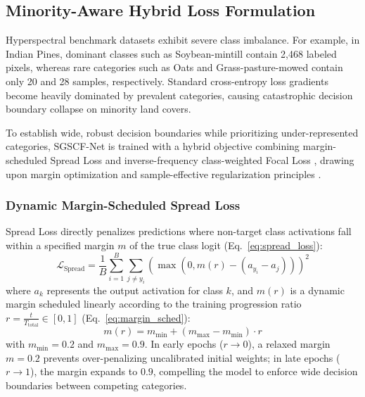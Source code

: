 \documentclass[manuscript,screen,review]{acmart}
\begin{document}
\subsection{Minority-Aware Hybrid Loss Formulation}
\label{subsec:loss}
Hyperspectral benchmark datasets exhibit severe class imbalance. For example, in Indian Pines, dominant classes such as Soybean-mintill contain 2,468 labeled pixels, whereas rare categories such as Oats and Grass-pasture-mowed contain only 20 and 28 samples, respectively. Standard cross-entropy loss gradients become heavily dominated by prevalent categories, causing catastrophic decision boundary collapse on minority land covers.

To establish wide, robust decision boundaries while prioritizing under-represented categories, SGSCF-Net is trained with a hybrid objective combining margin-scheduled Spread Loss \cite{sabour2018matrix} and inverse-frequency class-weighted Focal Loss \cite{lin2017focal}, drawing upon margin optimization and sample-effective regularization principles \cite{cui2019class, cao2019learning, haut2021generative}.

\subsubsection{Dynamic Margin-Scheduled Spread Loss}
Spread Loss directly penalizes predictions where non-target class activations fall within a specified margin $m$ of the true class logit (Eq.~\ref{eq:spread_loss}):
\begin{equation}
\label{eq:spread_loss}
\mathcal{L}_{\text{Spread}} = \frac{1}{B} \sum_{i=1}^B \sum_{j \neq y_i} \left(\max\left(0, m(r) - (a_{y_i} - a_j)\right)\right)^2
\end{equation}
where $a_k$ represents the output activation for class $k$, and $m(r)$ is a dynamic margin scheduled linearly according to the training progression ratio $r = \frac{t}{T_{\text{total}}} \in [0, 1]$ (Eq.~\ref{eq:margin_sched}):
\begin{equation}
\label{eq:margin_sched}
m(r) = m_{\min} + (m_{\max} - m_{\min}) \cdot r
\end{equation}
with $m_{\min} = 0.2$ and $m_{\max} = 0.9$. In early epochs ($r \to 0$), a relaxed margin $m=0.2$ prevents over-penalizing uncalibrated initial weights; in late epochs ($r \to 1$), the margin expands to $0.9$, compelling the model to enforce wide decision boundaries between competing categories.
\end{document}
